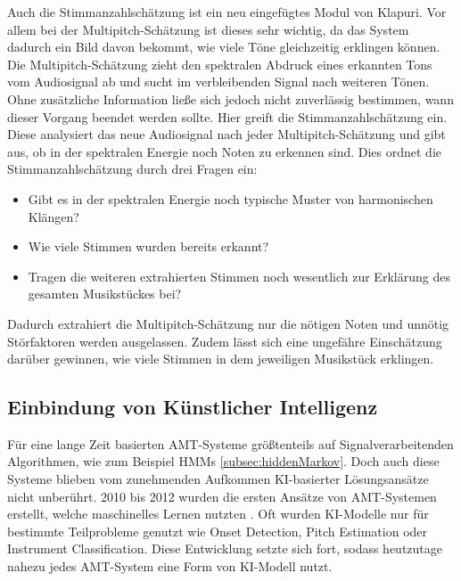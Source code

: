 \begin{description}[style=nextline]
\item[Multipitch-Schätzung]\label{itm:multi}
Auch die Stimmanzahlschätzung ist ein neu eingefügtes Modul von Klapuri.
Vor allem bei der Multipitch-Schätzung ist dieses sehr wichtig, da das System dadurch ein Bild davon bekommt,
wie viele Töne gleichzeitig erklingen können.
Die Multipitch-Schätzung zieht den spektralen Abdruck eines erkannten Tons vom Audiosignal ab und sucht im verbleibenden Signal nach weiteren Tönen.
Ohne zusätzliche Information ließe sich jedoch nicht zuverlässig bestimmen, wann dieser Vorgang beendet werden sollte.
Hier greift die Stimmanzahlschätzung ein.
Diese analysiert das neue Audiosignal nach jeder Multipitch-Schätzung und gibt aus,
ob in der spektralen Energie noch Noten zu erkennen sind.
Dies ordnet die Stimmanzahlschätzung durch drei Fragen ein:
\begin{itemize}
    \item Gibt es in der spektralen Energie noch typische Muster von harmonischen Klängen?
    \item Wie viele Stimmen wurden bereits erkannt?
    \item Tragen die weiteren extrahierten Stimmen noch wesentlich zur Erklärung des gesamten Musikstückes bei?
\end{itemize}
Dadurch extrahiert die Multipitch-Schätzung nur die nötigen Noten und unnötig Störfaktoren werden ausgelassen.
Zudem lässt sich eine ungefähre Einschätzung darüber gewinnen, wie viele Stimmen in dem jeweiligen Musikstück erklingen.
\end{description}

\subsection{Einbindung von Künstlicher Intelligenz}
Für eine lange Zeit basierten AMT-Systeme größtenteils auf Signalverarbeitenden Algorithmen,
wie zum Beispiel HMMs \ref{subsec:hiddenMarkov}.
Doch auch diese Systeme blieben vom zunehmenden Aufkommen KI-basierter Lösungsansätze nicht unberührt.
2010 bis 2012 wurden die ersten Ansätze von AMT-Systemen erstellt, welche maschinelles Lernen nutzten \cite{eyben2010universal}.
Oft wurden KI-Modelle nur für bestimmte Teilprobleme genutzt
wie Onset Detection, Pitch Estimation oder Instrument Classification.
Diese Entwicklung setzte sich fort, sodass heutzutage nahezu jedes AMT-System eine Form von KI-Modell nutzt.

